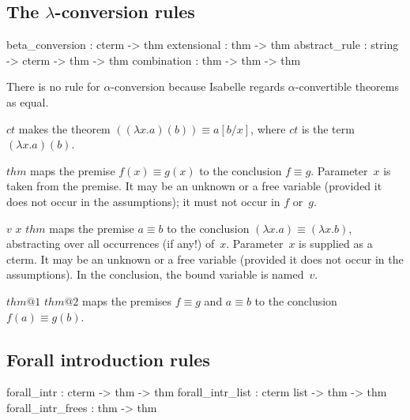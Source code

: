 \subsection{The $\lambda$-conversion rules}
\begin{ttbox} 
beta_conversion : cterm -> thm
extensional     : thm -> thm
abstract_rule   : string -> cterm -> thm -> thm
combination     : thm -> thm -> thm
\end{ttbox} 
There is no rule for $\alpha$-conversion because Isabelle regards
$\alpha$-convertible theorems as equal.
\begin{ttdescription}
\item[\ttindexbold{beta_conversion} $ct$] 
makes the theorem $((\lambda x.a)(b)) \equiv a[b/x]$, where $ct$ is the
term $(\lambda x.a)(b)$.

\item[\ttindexbold{extensional} $thm$] 
maps the premise $f(x) \equiv g(x)$ to the conclusion $f\equiv g$.
Parameter~$x$ is taken from the premise.  It may be an unknown or a free
variable (provided it does not occur in the assumptions); it must not occur
in $f$ or~$g$.

\item[\ttindexbold{abstract_rule} $v$ $x$ $thm$] 
maps the premise $a\equiv b$ to the conclusion $(\lambda x.a) \equiv
(\lambda x.b)$, abstracting over all occurrences (if any!) of~$x$.
Parameter~$x$ is supplied as a cterm.  It may be an unknown or a free
variable (provided it does not occur in the assumptions).  In the
conclusion, the bound variable is named~$v$.

\item[\ttindexbold{combination} $thm@1$ $thm@2$] 
maps the premises $f\equiv g$ and $a\equiv b$ to the conclusion~$f(a)\equiv
g(b)$.
\end{ttdescription}


\subsection{Forall introduction rules}
\begin{ttbox} 
forall_intr       : cterm      -> thm -> thm
forall_intr_list  : cterm list -> thm -> thm
forall_intr_frees :               thm -> thm
\end{ttbox}

